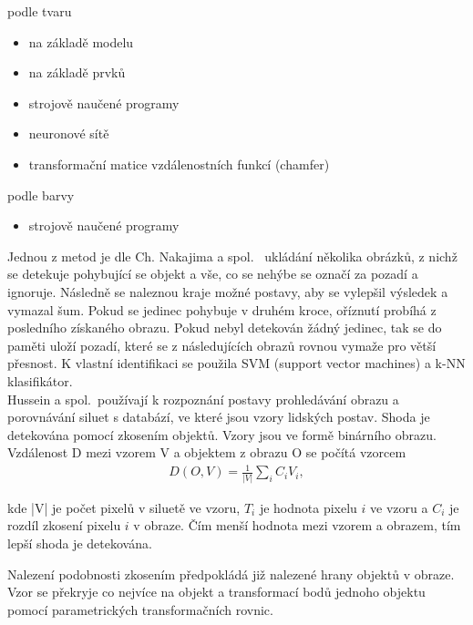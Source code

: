 podle tvaru
\begin{itemize}
\item na základě modelu


\item na základě prvků

\item strojově naučené programy
\item neuronové sítě %
\item transformační matice vzdálenostních funkcí (chamfer)
\end{itemize}

podle barvy
\begin{itemize}
\item strojově naučené programy\\
\end{itemize}


Jednou z metod je dle Ch. Nakajima a spol.~\cite{6} ukládání několika obrázků, z nichž se detekuje pohybující se objekt a vše, co se nehýbe se označí za pozadí a ignoruje. Následně se naleznou kraje možné postavy, aby se vylepšil výsledek a vymazal šum. Pokud se jedinec pohybuje v druhém kroce, oříznutí probíhá z posledního získaného obrazu. Pokud nebyl detekován žádný jedinec, tak se do paměti uloží pozadí, které se z následujících obrazů rovnou vymaže pro větší přesnost. K vlastní identifikaci se použila SVM (support vector machines) a k-NN klasifikátor.\\

Hussein a spol.~\cite{9}používají k rozpoznání postavy prohledávání obrazu a porovnávání siluet s databází, ve které jsou vzory lidských postav. Shoda je detekována pomocí zkosením objektů. Vzory jsou ve formě binárního obrazu. Vzdálenost D mezi vzorem V a objektem z obrazu O se počítá vzorcem\\

\begin{eqnarray}
 D(O,V) = \frac{1}{|V|}\sum_{i}^{}C_{i}V_{i}   ,
\end{eqnarray}

kde |V| je počet pixelů v siluetě ve vzoru, $ T_{i} $ je hodnota pixelu $ i $ ve vzoru a $ C_{i} $ je rozdíl zkosení pixelu $ i $ v obraze. Čím menší hodnota mezi vzorem a obrazem, tím lepší shoda je detekována.

Nalezení podobnosti zkosením předpokládá již nalezené hrany objektů v obraze. Vzor se překryje co nejvíce na objekt a transformací bodů jednoho objektu pomocí parametrických transformačních rovnic.\\

